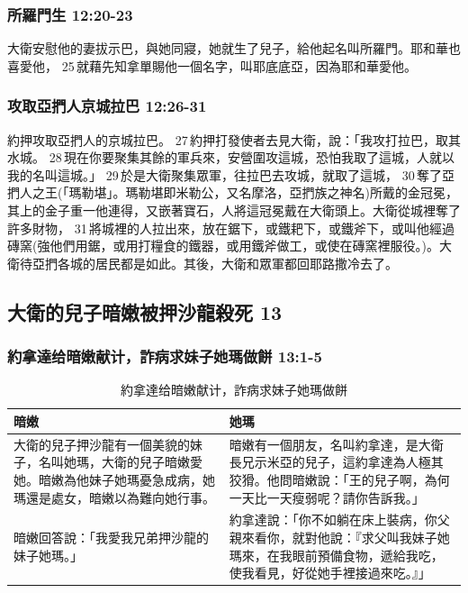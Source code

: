 \subsubsection{所羅門生 12:20-23}
大衛安慰他的妻拔示巴，與她同寢，她就生了兒子，給他起名叫所羅門。耶和華也喜愛他， 25 就藉先知拿單賜他一個名字，叫耶底底亞，因為耶和華愛他。

\subsubsection{攻取亞捫人京城拉巴 12:26-31}
約押攻取亞捫人的京城拉巴。 27 約押打發使者去見大衛，說：「我攻打拉巴，取其水城。 28 現在你要聚集其餘的軍兵來，安營圍攻這城，恐怕我取了這城，人就以我的名叫這城。」 29 於是大衛聚集眾軍，往拉巴去攻城，就取了這城， 30 奪了亞捫人之王(「瑪勒堪」。瑪勒堪即米勒公，又名摩洛，亞捫族之神名)所戴的金冠冕，其上的金子重一他連得，又嵌著寶石，人將這冠冕戴在大衛頭上。大衛從城裡奪了許多財物， 31 將城裡的人拉出來，放在鋸下，或鐵耙下，或鐵斧下，或叫他經過磚窯(強他們用鋸，或用打糧食的鐵器，或用鐵斧做工，或使在磚窯裡服役。)。大衛待亞捫各城的居民都是如此。其後，大衛和眾軍都回耶路撒冷去了。

\subsection{大衛的兒子暗嫩被押沙龍殺死 13}
\subsubsection{約拿達给暗嫩献计，詐病求妹子她瑪做餅 13:1-5}
\begin{table}[H]
\hspace*{-3mm}
\centering 
\begin{tabular}{p{8.25cm}|p{8.75cm}}\hline\hline
暗嫩&她瑪\\\hline
大衛的兒子押沙龍有一個美貌的妹子，名叫她瑪，大衛的兒子暗嫩愛她。暗嫩為他妹子她瑪憂急成病，她瑪還是處女，暗嫩以為難向她行事。&暗嫩有一個朋友，名叫約拿達，是大衛長兄示米亞的兒子，這約拿達為人極其狡猾。他問暗嫩說：「王的兒子啊，為何一天比一天瘦弱呢？請你告訴我。」\\\hline
暗嫩回答說：「我愛我兄弟押沙龍的妹子她瑪。」&約拿達說：「你不如躺在床上裝病，你父親來看你，就對他說：『求父叫我妹子她瑪來，在我眼前預備食物，遞給我吃，使我看見，好從她手裡接過來吃。』」\\\hline
\end{tabular}
\caption{約拿達给暗嫩献计，詐病求妹子她瑪做餅}
\end{table}

